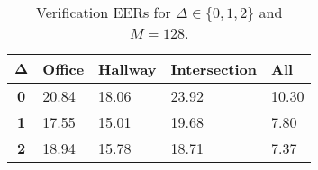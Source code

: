 \begin{table}[h]
    \centering
    \begin{tabular}{|c|M{2cm}|M{2cm}|M{2cm}|M{2cm}|}
    \hline
    $\boldsymbol{\Delta}$ & \bf{Office} & \bf{Hallway} & \bf{Intersection} & \bf{All} \\ 
    \hline 
    \hline
    \bf{0} & 20.84 & 18.06 & 23.92 & 10.30 \\
    \hline
    \bf{1} & 17.55 & 15.01 & 19.68 & 7.80 \\
    \hline
    \bf{2} & 18.94 & 15.78 & 18.71 & 7.37 \\
    \hline
    \end{tabular}
    \caption{Verification EERs for $\Delta \in \{0, 1, 2\}$ and $M = 128$.}
    \label{tab:verify_adapted_wmv_M_128}
\end{table}
